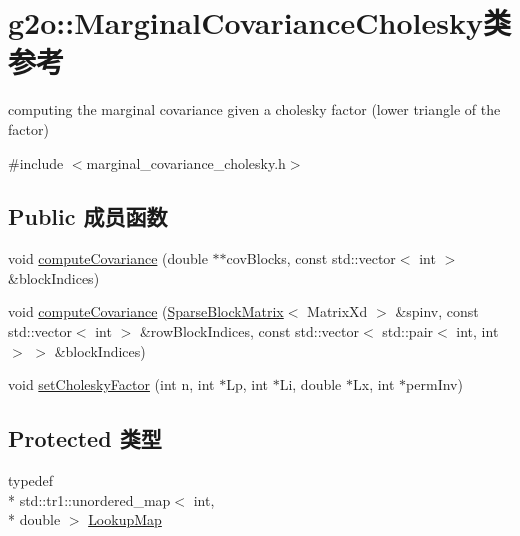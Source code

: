 \hypertarget{classg2o_1_1MarginalCovarianceCholesky}{\section{g2o\-:\-:Marginal\-Covariance\-Cholesky类 参考}
\label{classg2o_1_1MarginalCovarianceCholesky}
}


computing the marginal covariance given a cholesky factor (lower triangle of the factor)  




{\ttfamily \#include $<$marginal\-\_\-covariance\-\_\-cholesky.\-h$>$}

\subsection*{Public 成员函数}
\begin{DoxyCompactItemize}
\item 
void \hyperlink{classg2o_1_1MarginalCovarianceCholesky_a0ea50dbda0558ca98faacafc8c9f48c9}{compute\-Covariance} (double $\ast$$\ast$cov\-Blocks, const std\-::vector$<$ int $>$ \&block\-Indices)
\item 
void \hyperlink{classg2o_1_1MarginalCovarianceCholesky_a77e7396fb18b334b4d707f41e5e05399}{compute\-Covariance} (\hyperlink{classg2o_1_1SparseBlockMatrix}{Sparse\-Block\-Matrix}$<$ Matrix\-Xd $>$ \&spinv, const std\-::vector$<$ int $>$ \&row\-Block\-Indices, const std\-::vector$<$ std\-::pair$<$ int, int $>$ $>$ \&block\-Indices)
\item 
void \hyperlink{classg2o_1_1MarginalCovarianceCholesky_a53bda8bc29bee2a7fb871c25a58ab191}{set\-Cholesky\-Factor} (int n, int $\ast$Lp, int $\ast$Li, double $\ast$Lx, int $\ast$perm\-Inv)
\end{DoxyCompactItemize}
\subsection*{Protected 类型}
\begin{DoxyCompactItemize}
\item 
typedef \\*
std\-::tr1\-::unordered\-\_\-map$<$ int, \\*
double $>$ \hyperlink{classg2o_1_1MarginalCovarianceCholesky_a9925dd2e45479a7feb783ff71d93fdbc}{Lookup\-Map}
\end{DoxyCompactItemize}
